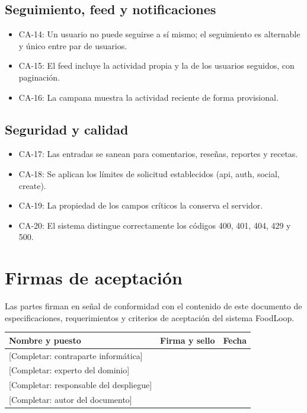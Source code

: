 \documentclass[doc,12pt,a4paper]{apa7}
\begin{document}
\subsection{Seguimiento, feed y notificaciones}

\begin{itemize}
    \item CA-14: Un usuario no puede seguirse a sí mismo; el seguimiento es alternable y único entre par de usuarios.
    \item CA-15: El feed incluye la actividad propia y la de los usuarios seguidos, con paginación.
    \item CA-16: La campana muestra la actividad reciente de forma provisional.
\end{itemize}

\subsection{Seguridad y calidad}

\begin{itemize}
    \item CA-17: Las entradas se sanean para comentarios, reseñas, reportes y recetas.
    \item CA-18: Se aplican los límites de solicitud establecidos (api, auth, social, create).
    \item CA-19: La propiedad de los campos críticos la conserva el servidor.
    \item CA-20: El sistema distingue correctamente los códigos 400, 401, 404, 429 y 500.
\end{itemize}

\section{Firmas de aceptación}

Las partes firman en señal de conformidad con el contenido de este documento de especificaciones, requerimientos y criterios de aceptación del sistema FoodLoop.

\vspace{1cm}

\begin{center}
\renewcommand{\arraystretch}{2.2}
\begin{tabular}{|P{5.0cm}|P{5.0cm}|P{4.0cm}|}
\hline
\textbf{Nombre y puesto} & \textbf{Firma y sello} & \textbf{Fecha} \\ \hline
\rule{0pt}{1.4cm}[Completar: contraparte informática] & & \\ \hline
\rule{0pt}{1.4cm}[Completar: experto del dominio] & & \\ \hline
\rule{0pt}{1.4cm}[Completar: responsable del despliegue] & & \\ \hline
\rule{0pt}{1.4cm}[Completar: autor del documento] & & \\ \hline
\end{tabular}
\end{center}
\end{document}
